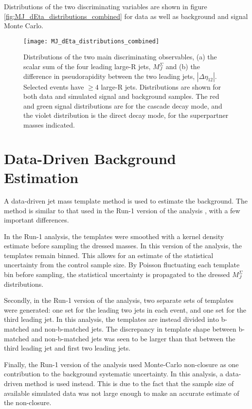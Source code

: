 Distributions of the two discriminating variables are shown in figure
\ref{fig:MJ_dEta_distributions_combined} for data as well as
background and signal Monte Carlo.

\begin{figure}[h]
\texttt{[image: MJ\_dEta\_distributions\_combined]}
\caption{Distributions of the two main discriminating observables, (a) the scalar sum of the four leading large-R jets, $M_{J}^{\Sigma}$ and (b) the difference in pseudorapidity between the two leading jets, $|\Delta\eta_{12}|$. Selected events have $\geq 4$ large-R jets. Distributions are shown for both data and simulated signal and background samples. The red and green signal distributions are for the cascade decay mode, and the violet distribution is the direct decay mode, for the superpartner masses indicated.}
\label{fig:MJ_dEta_distributions}
\end{figure}

\section{Data-Driven Background Estimation} \label{bkg_estimation}
A data-driven jet mass template method is used to estimate the
background. The method is similar to that used in the Run-1 version of
the analysis \cite{run1-multijet}, with a
few important differences.

In the Run-1 analysis, the templates were smoothed with a kernel
density estimate before sampling the dressed masses. In this version
of the analysis, the templates remain binned. This allows for an
estimate of the statistical uncertainty from the control sample
size. By Poisson fluctuating each template bin before sampling, the
statistical uncertainty is propagated to the dressed $M_J^{\Sigma}$
distributions.

Secondly, in the Run-1 version of the analysis, two separate sets of templates
were generated: one set for the leading two jets in each event, and
one set for the third leading jet. In this analysis, the templates are
instead divided into b-matched and non-b-matched jets. The discrepancy
in template shape between b-matched and non-b-matched jets was seen to
be larger than that between the third leading jet and first two
leading jets. 

Finally, the Run-1 version of the analysis used Monte-Carlo
non-closure as one contribution to the background systematic
uncertainty. In this analysis, a data-driven method is used
instead. This is due to the fact that the sample size of available
simulated data was not large enough to make an accurate estimate of
the non-closure.

